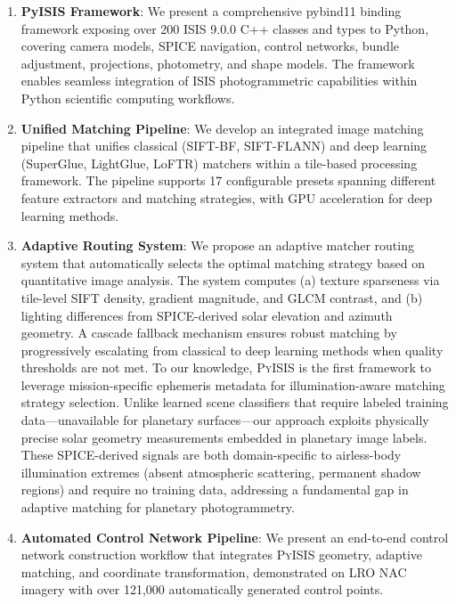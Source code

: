 \documentclass[lettersize,journal]{IEEEtran}
\newcommand{\pyisis}{\textsc{PyISIS}}
\begin{document}
\begin{enumerate}
    \item \textbf{PyISIS Framework}: We present a comprehensive pybind11 binding framework exposing over 200 ISIS 9.0.0 C++ classes and types to Python, covering camera models, SPICE navigation, control networks, bundle adjustment, projections, photometry, and shape models. The framework enables seamless integration of ISIS photogrammetric capabilities within Python scientific computing workflows.

    \item \textbf{Unified Matching Pipeline}: We develop an integrated image matching pipeline that unifies classical (SIFT-BF, SIFT-FLANN) and deep learning (SuperGlue, LightGlue, LoFTR) matchers within a tile-based processing framework. The pipeline supports 17 configurable presets spanning different feature extractors and matching strategies, with GPU acceleration for deep learning methods.

    \item \textbf{Adaptive Routing System}: We propose an adaptive matcher routing system that automatically selects the optimal matching strategy based on quantitative image analysis. The system computes (a) texture sparseness via tile-level SIFT density, gradient magnitude, and GLCM contrast, and (b) lighting differences from SPICE-derived solar elevation and azimuth geometry. A cascade fallback mechanism ensures robust matching by progressively escalating from classical to deep learning methods when quality thresholds are not met. To our knowledge, \pyisis{} is the first framework to leverage mission-specific ephemeris metadata for illumination-aware matching strategy selection. Unlike learned scene classifiers that require labeled training data---unavailable for planetary surfaces---our approach exploits physically precise solar geometry measurements embedded in planetary image labels. These SPICE-derived signals are both domain-specific to airless-body illumination extremes (absent atmospheric scattering, permanent shadow regions) and require no training data, addressing a fundamental gap in adaptive matching for planetary photogrammetry.

    \item \textbf{Automated Control Network Pipeline}: We present an end-to-end control network construction workflow that integrates \pyisis{} geometry, adaptive matching, and coordinate transformation, demonstrated on LRO NAC imagery with over 121,000 automatically generated control points.
\end{enumerate}
\end{document}
